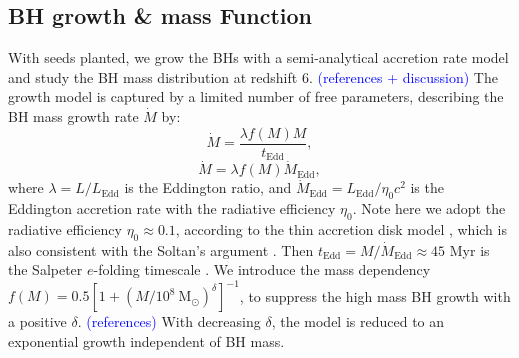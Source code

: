 \documentclass[nolinenumbers,preprint2,tighten]{aastex631}
\newcommand{\Msun}{\mathrm{M_\odot}}
\newcommand{\Mdot}{\dot{M}}
\newcommand{\tEdd}{t_\mathrm{Edd}}
\newcommand{\blue}[1]{\textcolor{blue}{ #1}}
\begin{document}
\begin{CJK*}{UTF8}{gbsn}
\subsection{BH growth \& mass Function}\label{sec:MF}
With seeds planted, we grow the BHs with a semi-analytical accretion rate model 
and study the BH mass distribution at redshift 6. 
\blue{(references + discussion)}
The growth model is captured by a limited number of free parameters, 
describing the BH mass growth rate $\Mdot$ by: 
\begin{equation*}
  \label{eq:mdot_1}
  \Mdot = \frac{\lambda f\left(M\right) M}{\tEdd} ,
\end{equation*}
\begin{equation}
  \label{eq:mdot}
  \Mdot = \lambda f\left(M\right) \Mdot_\mathrm{Edd} ,
\end{equation}
where $\lambda = L/L_\mathrm{Edd}$ is the Eddington ratio,
and $\Mdot_\mathrm{Edd} = L_{\mathrm{Edd}}/\eta_0 c^2$ is the Eddington accretion rate with the radiative efficiency $\eta_0$.
Note here we adopt the radiative efficiency $\eta_0 \approx 0.1 $,
according to the thin accretion disk model \citep{1973A&A....24..337S}, 
which is also consistent with the Soltan's argument \citep{1982MNRAS.200..115S,2002MNRAS.335..965Y}.
Then $\tEdd =  M/\Mdot_{\mathrm{Edd}} \approx 45$ Myr is the Salpeter $e$-folding timescale \citep{1964ApJ...140..796S}.
We introduce the mass dependency 
$f(M) = 0.5 \left[1+\left(M/10^8~\Msun\right)^\delta\right] ^ {-1}$, 
to suppress the high mass BH growth with a positive $\delta$. 
\blue{(references)}
With decreasing $\delta$, 
the model is reduced to an exponential growth independent of BH mass.


\end{CJK*}
\end{document}
